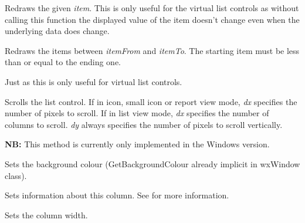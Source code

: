 Redraws the given {\it item}. This is only useful for the virtual list controls
as without calling this function the displayed value of the item doesn't change
even when the underlying data does change.





\label{wxlistctrlrefreshitems}


Redraws the items between {\it itemFrom} and {\it itemTo}. The starting item
must be less than or equal to the ending one.

Just as  this is only useful for
virtual list controls.



\label{wxlistctrlscrolllist}


Scrolls the list control. If in icon, small icon or report view mode,
{\it dx} specifies the number of pixels to scroll. If in list view mode,
{\it dx} specifies the number of columns to scroll. {\it dy} always specifies
the number of pixels to scroll vertically.

{\bf NB:} This method is currently only implemented in the Windows version.


\label{wxlistctrlsetbackgroundcolour}


Sets the background colour (GetBackgroundColour already implicit in
wxWindow class).


\label{wxlistctrlsetcolumn}


Sets information about this column. See  for more
information.


\label{wxlistctrlsetcolumnwidth}


Sets the column width.

